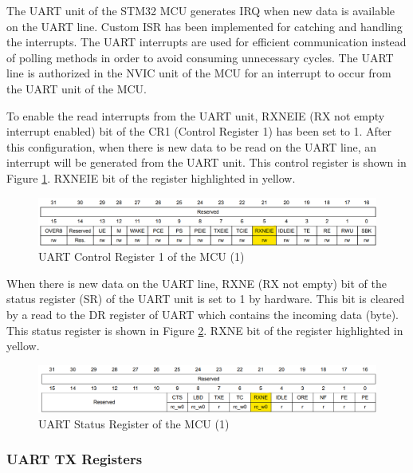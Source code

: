 The UART unit of the STM32 MCU generates IRQ when new data is available on the UART line. Custom ISR has been implemented for catching and handling the interrupts. The UART interrupts are used for efficient communication instead of polling methods in order to avoid consuming unnecessary cycles. The UART line is authorized in the NVIC unit of the MCU for an interrupt to occur from the UART unit of the MCU. 

To enable the read interrupts from the UART unit, RXNEIE (RX not empty interrupt enabled) bit of the CR1 (Control Register 1) has been set to 1. After this configuration, when there is new data to be read on the UART line, an interrupt will be generated from the UART unit. This control register is shown in Figure \ref{fig:uart_cr_register}. RXNEIE bit of the register highlighted in yellow.

\begin{figure}[!htbp]
    \centering
    \includegraphics[width=1\textwidth]{Imgs/cr_register.png}
    \caption{\label{fig:uart_cr_register}UART Control Register 1 of the MCU (1) \cite{Ref_stm32_um}}
\end{figure}

When there is new data on the UART line, RXNE (RX not empty) bit of the status register (SR) of the UART unit is set to 1 by hardware. This bit is cleared by a read to the DR register of UART which contains the incoming data (byte). This status register is shown in Figure \ref{fig:uart_sr_register}. RXNE bit of the register highlighted in yellow.

\begin{figure}[!htbp]
    \centering
    \includegraphics[width=1\textwidth]{Imgs/sr_register.png}
    \caption{\label{fig:uart_sr_register}UART Status Register of the MCU (1) \cite{Ref_stm32_um}}
\end{figure}


\subsubsection{UART TX Registers}
\label{sec_transmit_rc_info}

